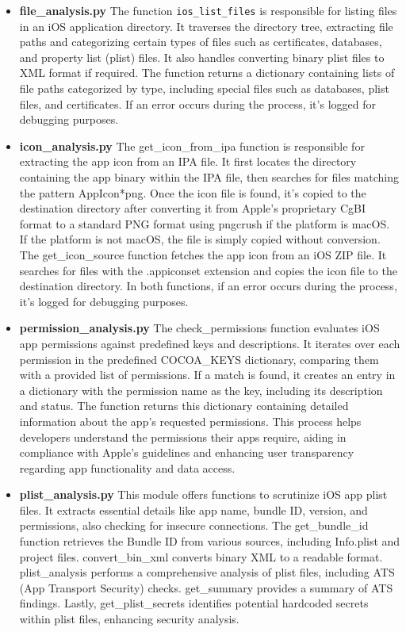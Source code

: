 \documentclass{report}
\begin{document}
\begin{itemize}
\begin{itemize}
\begin{itemize}
                    \item \textbf{file\_analysis.py}
                    The function \texttt{ios\_list\_files} is responsible for listing files in an iOS application directory. It traverses the directory tree, extracting file paths and categorizing certain types of files such as certificates, databases, and property list (plist) files. It also handles converting binary plist files to XML format if required. The function returns a dictionary containing lists of file paths categorized by type, including special files such as databases, plist files, and certificates. If an error occurs during the process, it's logged for debugging purposes.
                    \item \textbf{icon\_analysis.py}
                    The get\_icon\_from\_ipa function is responsible for extracting the app icon from an IPA file. It first locates the directory containing the app binary within the IPA file, then searches for files matching the pattern AppIcon*png. Once the icon file is found, it's copied to the destination directory after converting it from Apple's proprietary CgBI format to a standard PNG format using pngcrush if the platform is macOS. If the platform is not macOS, the file is simply copied without conversion.
                    The get\_icon\_source function fetches the app icon from an iOS ZIP file. It searches for files with the .appiconset extension and copies the icon file to the destination directory. In both functions, if an error occurs during the process, it's logged for debugging purposes.
                    \item \textbf{permission\_analysis.py}
                    The check\_permissions function evaluates iOS app permissions against predefined keys and descriptions. It iterates over each permission in the predefined COCOA\_KEYS dictionary, comparing them with a provided list of permissions. If a match is found, it creates an entry in a dictionary with the permission name as the key, including its description and status. The function returns this dictionary containing detailed information about the app's requested permissions. This process helps developers understand the permissions their apps require, aiding in compliance with Apple's guidelines and enhancing user transparency regarding app functionality and data access.
                    \item \textbf{plist\_analysis.py}
                    This module offers functions to scrutinize iOS app plist files. It extracts essential details like app name, bundle ID, version, and permissions, also checking for insecure connections. The get\_bundle\_id function retrieves the Bundle ID from various sources, including Info.plist and project files. convert\_bin\_xml converts binary XML to a readable format. plist\_analysis performs a comprehensive analysis of plist files, including ATS (App Transport Security) checks. get\_summary provides a summary of ATS findings. Lastly, get\_plist\_secrets identifies potential hardcoded secrets within plist files, enhancing security analysis.

\end{itemize}
\end{itemize}
\end{itemize}
\end{document}

